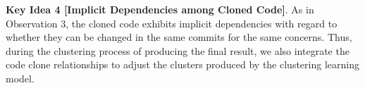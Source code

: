 {\bf Key Idea 4 [Implicit Dependencies among Cloned Code]}. As in
Observation 3, the cloned code exhibits implicit dependencies with
regard to whether they can be changed in the same commits for the same
concerns. Thus, during the clustering process of producing the final
result, we also integrate the code clone relationships to
adjust the clusters produced by the clustering learning model.


